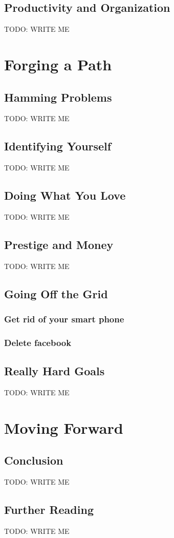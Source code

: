 \documentclass[]{book}
\newcommand{\TOWRITE}{TODO: WRITE ME}
\begin{document}
\chapter{Productivity and Organization}
\TOWRITE


\part{Forging a Path}

\chapter{Hamming Problems}
\TOWRITE

\chapter{Identifying Yourself}
\TOWRITE

\chapter{Doing What You Love}
\TOWRITE

\chapter{Prestige and Money}
\TOWRITE



\chapter{Going Off the Grid}
\section{Get rid of your smart phone}
\section{Delete facebook}



\chapter{Really Hard Goals}
\TOWRITE


\part{Moving Forward}

\chapter{Conclusion}
\TOWRITE

\chapter{Further Reading}
\TOWRITE
\end{document}
